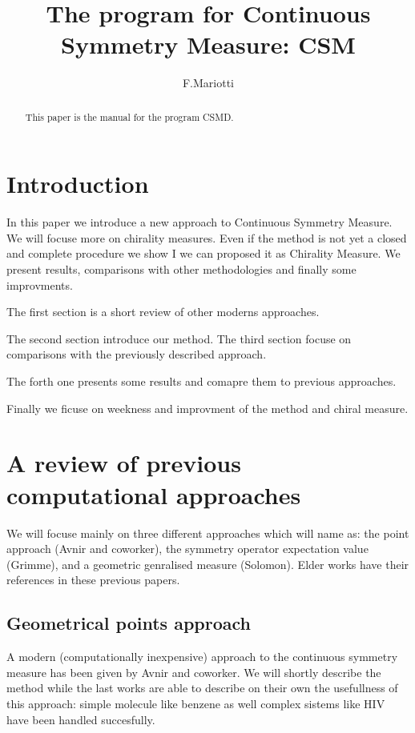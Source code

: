\documentclass[a4paper,12pt]{article}
\begin{document}
\title{The program for Continuous Symmetry Measure: CSM}
\author{F.Mariotti}
\date{}
\maketitle

\begin{abstract}

This paper is the manual for the program CSMD.

\end{abstract}

\tableofcontents

\section{Introduction}

In this paper we introduce a new approach to Continuous Symmetry Measure.
We will focuse more on chirality measures. Even if the method is not yet
a closed and complete procedure we show I we can proposed it as Chirality
Measure. We present results, comparisons with other methodologies and
finally some improvments.

The first section is a short review of other moderns approaches.

The second section introduce our method.
The third section focuse on comparisons with the previously described approach.

The forth one presents some results and comapre them to previous
approaches.

Finally we ficuse on weekness and improvment of the method and chiral measure.

\section{A review of previous computational approaches}

We will focuse mainly on three different approaches which will name as:
the point approach (Avnir and coworker), the symmetry operator expectation value
(Grimme), and a geometric genralised measure (Solomon). Elder works have
their references in these previous papers.

\subsection{Geometrical points approach}

A modern (computationally inexpensive) approach to the
continuous symmetry measure has been given by Avnir
and coworker\cite{Avnir1,Avnir2}. We will shortly describe the method
while the last works are able to describe on their own the usefullness
of this approach: simple molecule like benzene\cite{AvnirBenzene}
as well complex sistems like HIV\cite{AvnirHIV} have been handled
succesfully.
\end{document}
